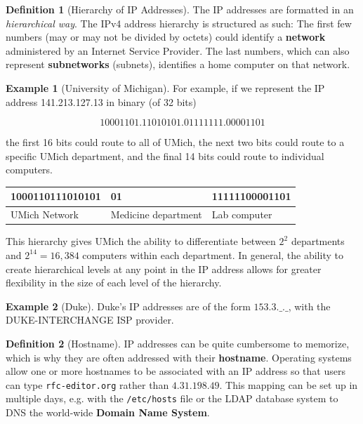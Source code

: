 \documentclass{article}
\theoremstyle{definition}
\newtheorem{example}{Example}[section]
\newtheorem{definition}{Definition}[section]
\begin{document}
    \begin{definition}[Hierarchy of IP Addresses] 
      The IP addresses are formatted in an \textit{hierarchical way}. The IPv4 address hierarchy is structured as such: The first few numbers (may or may not be divided by octets) could identify a \textbf{network} administered by an Internet Service Provider. The last numbers, which can also represent \textbf{subnetworks} (subnets), identifies a home computer on that network. 
    \end{definition}

    \begin{example}[University of Michigan]
      For example, if we represent the IP address 141.213.127.13 in binary (of 32 bits)

        \[10001101.11010101.01111111.00001101\]

      the first 16 bits could route to all of UMich, the next two bits could route to a specific UMich department, and the final 14 bits could route to individual computers. 
      \begin{center}
      \begin{tabular}{l|l|l}
          1000110111010101 & 01 & 11111100001101  \\
          \hline
          UMich Network & Medicine department & Lab computer 
      \end{tabular}
      \end{center}
      This hierarchy gives UMich the ability to differentiate between $2^2$ departments and $2^{14} = 16,384$ computers within each department. In general, the ability to create hierarchical levels at any point in the IP address allows for greater flexibility in the size of each level of the hierarchy. 
    \end{example}
    
    \begin{example}[Duke]
      Duke's IP addresses are of the form $153.3.\_.\_$, with the DUKE-INTERCHANGE ISP provider.  
    \end{example} 

    \begin{definition}[Hostname]
      IP addresses can be quite cumbersome to memorize, which is why they are often addressed with their \textbf{hostname}. Operating systems allow one or more hostnames to be associated with an IP address so that users can type \texttt{rfc-editor.org} rather than $4.31.198.49$. This mapping can be set up  in multiple days, e.g. with the \texttt{/etc/hosts} file or the LDAP database system to DNS the world-wide \textbf{Domain Name System}. 
    \end{definition}
\end{document}

